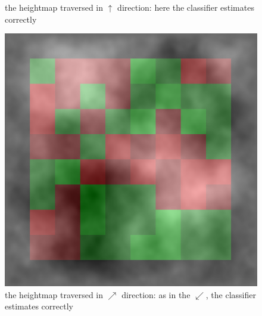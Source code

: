 \documentclass[]{usiinfbachelorproject}
\begin{document}
\begin{figure}[H]
    \caption{the heightmap traversed in $\uparrow$ direction: here the classifier estimates correctly}\label{fig:heatmap270}
\endminipage\hfill
{}
  \includegraphics[width=\linewidth]{heatmap315}
    \caption{the heightmap traversed in $\nearrow$ direction: as in the $\swarrow$, the classifier estimates correctly}\label{fig:heatmap315}
\endminipage\hfill
\end{figure}

\newpage
\end{document}
